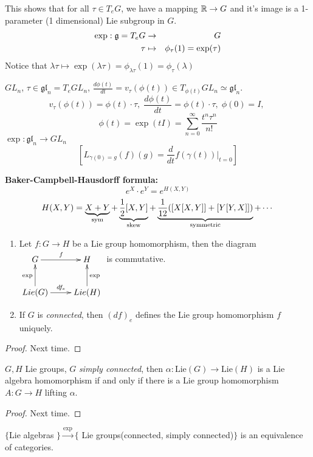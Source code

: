  This shows that for all $\tau \in T_eG$, we have a mapping
 $\mathbb{R} \rightarrow G$ and it's image is a 1-parameter
 (1 dimensional) Lie subgroup in $G$.
 \begin{eqnarray*}
 \exp : \mathfrak{g}=T_eG & \rightarrow & G \\
        \tau    & \mapsto     & \phi_{\tau}(1)=\exp(\tau)
 \end{eqnarray*}
 Notice that $\lambda\tau \mapsto
 \exp(\lambda\tau)=\phi_{\lambda\tau}(1)=\phi_{\tau}(\lambda)$

 \begin{example} $GL_n$, $\tau \in \mathfrak{gl}_n=T_eGL_n$,
 $\frac{d\phi(t)}{dt}=v_{\tau}(\phi(t))\in T_{\phi(t)}GL_n \simeq
 \mathfrak{gl}_n$. \[ v_{\tau}(\phi(t))=\phi(t)\cdot \tau,\;
 \frac{d\phi(t)}{dt}=\phi(t)\cdot \tau,\; \phi(0)=I,\;\]
 \[\phi(t)=\exp(tI)=\sum_{n=0}^{\infty} \frac{t^n\tau^n}{n!}\] $\exp:
 \mathfrak{gl}_n \rightarrow GL_n$
 \[
 \left[ L_{\gamma(0)=g}(f)(g)=\frac{d}{dt}f(\gamma(t))|_{t=0}\right]
 \]
 \end{example}

  {\bf Baker-Campbell-Hausdorff formula:}
  \[ e^X\cdot e^Y = e^{H(X,Y)} \]
  \[ H(X,Y) = \underbrace{X+Y}_{\rm sym} + \underbrace{\frac{1}{2}[X,Y]}_{\rm skew} +
  \underbrace{\frac{1}{12}([X[X,Y]]+[Y[Y,X]])}_{\rm symmetric} + \cdots
  \]

 \begin{proposition}
  \begin{enumerate}
  \item Let $f:G\rightarrow H$ be a Lie group
  homomorphism, then the diagram
  $\xymatrix{
    G \ar[r]^f \ar@{<-}[d]_\exp & H \ar@{<-}[d]^\exp\\
    Lie(G)\ar[r]^{df_e} & Lie(H)
  }$
  is commutative.
  \item If $G$ is \emph{connected}, then $(df)_e$ defines the Lie group
  homomorphism $f$ uniquely.
  \end{enumerate}
 \end{proposition}
 \begin{proof}
 Next time.
 \end{proof}

 \begin{proposition} $G,H$ Lie groups, $G$ \emph{simply connected},
 then $\alpha:\mathrm{Lie}(G) \rightarrow \mathrm{Lie}(H)$ is a Lie
 algebra homomorphism if and only if there is a Lie group homomorphism
 $A:G\rightarrow H$ lifting $\alpha$.
 \end{proposition}
 \begin{proof}
 Next time.
 \end{proof}

 $\{$Lie algebras $\}\xrightarrow{\exp}\{$ Lie
 groups(connected, simply connected)$\}$ is an equivalence of
 categories.
